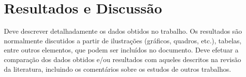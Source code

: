 
\graphicspath{%
  {./Chapter-4/}%
}

\chapter{Resultados e Discussão}%
\label{chpt:rslt-disc}

Deve descrever detalhadamente os dados obtidos no trabalho.
Os resultados são normalmente discutidos a partir de ilustrações (gráficos, quadros, etc.), tabelas, entre outros elementos, que podem ser incluídos no documento.
Deve efetuar a comparação dos dados obtidos e/ou resultados com aqueles descritos na revisão da literatura, incluindo os comentários sobre os estudos de outros trabalhos.

